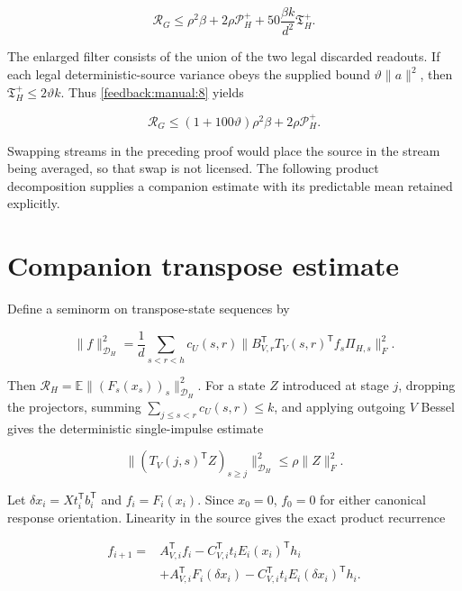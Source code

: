 \documentclass[11pt,oneside,openany,a4paper]{book}
\numberwithin{equation}{chapter}
\theoremstyle{definition}
\theoremstyle{remark}
\begin{document}
\[
\boxed{\displaystyle
\mathcal R_G\le\rho^2\beta+2\rho\mathcal P_H^+
+50\frac{\beta k}{d^2}\mathfrak T_H^+.}\tag{\thechapter.8}\label{feedback:manual:8}
\]

The enlarged filter consists of the union of the two legal discarded readouts. If each legal deterministic-source variance obeys the supplied bound \(\vartheta\|a\|^2\), then \(\mathfrak T_H^+\le2\vartheta k\). Thus \eqref{feedback:manual:8} yields

\[
\mathcal R_G\le(1+100\vartheta)\rho^2\beta+2\rho\mathcal P_H^+.\tag{\thechapter.9}\label{feedback:manual:9}
\]

Swapping streams in the preceding proof would place the source in the stream being averaged, so that swap is not licensed. The following product decomposition supplies a companion estimate with its predictable mean retained explicitly.

\section{Companion transpose estimate}\label{feedback:companion-transpose-estimate}

Define a seminorm on transpose-state sequences by

\[
\|f\|_{\mathscr D_H}^2=\frac1d\sum_{s<r<h}c_U(s,r)
\|B_{V,r}^{\mathsf T}T_V(s,r)^{\mathsf T}f_s\Pi_{H,s}\|_F^2.
\tag{\thechapter.10}\label{feedback:manual:10}
\]

Then \(\mathcal R_H=\mathbb E\|(F_s(x_s))_s\|_{\mathscr D_H}^2\). For a state \(Z\) introduced at stage \(j\), dropping the projectors, summing \(\sum_{j\le s<r}c_U(s,r)\le k\), and applying outgoing \(V\) Bessel gives the deterministic single-impulse estimate

\[
\|(T_V(j,s)^{\mathsf T}Z)_{s\ge j}\|_{\mathscr D_H}^2\le\rho\|Z\|_F^2.
\tag{\thechapter.11}\label{feedback:manual:11}
\]

Let \(\delta x_i=Xt_i^{\mathsf T}b_i^{\mathsf T}\) and \(f_i=F_i(x_i)\). Since \(x_0=0\), \(f_0=0\) for either canonical response orientation. Linearity in the source gives the exact product recurrence

\[
\begin{split}
f_{i+1}={}&A_{V,i}^{\mathsf T}f_i
-C_{V,i}^{\mathsf T}t_iE_i(x_i)^{\mathsf T}h_i\\
&+A_{V,i}^{\mathsf T}F_i(\delta x_i)
-C_{V,i}^{\mathsf T}t_iE_i(\delta x_i)^{\mathsf T}h_i.
\end{split}\tag{\thechapter.12}\label{feedback:manual:12}
\]
\end{document}
